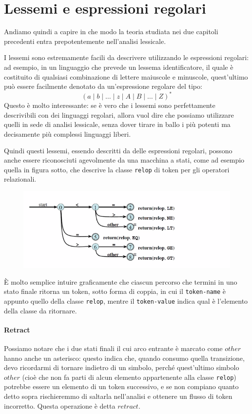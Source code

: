 \documentclass[class=book, crop=false, oneside, 12pt]{standalone}
\begin{document}
\section{Lessemi e espressioni regolari}
Andiamo quindi a capire in che modo la teoria studiata nei due capitoli precedenti entra prepotentemente nell'analisi lessicale.

I lessemi sono estremamente facili da descrivere utilizzando le espressioni regolari: ad esempio, in un linguaggio che prevede un lessema identificatore, il quale è costituito di qualsiasi combinazione di lettere maiuscole e minuscole, quest'ultimo può essere facilmente denotato da un'espressione regolare del tipo:
\begin{equation*}
    (a \mid b \mid \ldots \mid z \mid A \mid B \mid \ldots \mid Z)^*
\end{equation*}
Questo è molto interessante: se è vero che i lessemi sono perfettamente descrivibili con dei linguaggi regolari, allora vuol dire che possiamo utilizzare quelli in sede di analisi lessicale, senza dover tirare in ballo i più potenti ma decisamente più complessi linguaggi liberi.

Quindi questi lessemi, essendo descritti da delle espressioni regolari, possono anche essere riconosciuti agevolmente da una macchina a stati, come ad esempio quella in figura sotto, che descrive la classe \texttt{relop} di token per gli operatori relazionali.
\begin{figure}[H]
    \centering
    \includegraphics[width=\textwidth,keepaspectratio]{lec-14-1}
    \caption{}
\end{figure}
È molto semplice intuire graficamente che ciascun percorso che termini in uno stato finale ritorna un token, sotto forma di coppia, in cui il \texttt{token-name} è appunto quello della classe \texttt{relop}, mentre il \texttt{token-value} indica qual è l'elemento della classe da ritornare.

\paragraph{Retract}
Possiamo notare che i due stati finali il cui arco entrante è marcato come \(other\) hanno anche un asterisco: questo indica che, quando consumo quella transizione, devo ricordarmi di tornare indietro di un simbolo, perché quest'ultimo simbolo \(other\) (cioè che non fa parti di alcun elemento appartenente alla classe \texttt{relop}) potrebbe essere un elemento di un token successivo, e se non compiano quanto detto sopra rischieremmo di saltarla nell'analisi e ottenere un flusso di token incorretto. Questa operazione è detta \(retract\).
\end{document}

